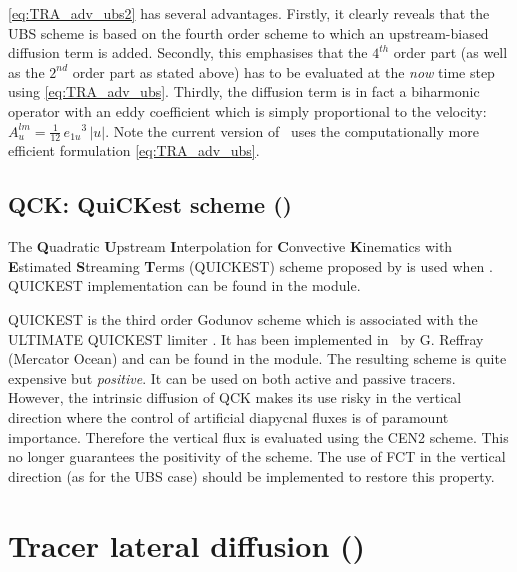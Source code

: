\documentclass[../main/NEMO_manual]{subfiles}
\begin{document}
\autoref{eq:TRA_adv_ubs2} has several advantages.
Firstly, it clearly reveals that the UBS scheme is based on the fourth order scheme to which
an upstream-biased diffusion term is added.
Secondly,
this emphasises that the $4^{th}$ order part (as well as the $2^{nd}$ order part as stated above) has to be evaluated at the \textit{now} time step using \autoref{eq:TRA_adv_ubs}.
Thirdly, the diffusion term is in fact a biharmonic operator with
an eddy coefficient which is simply proportional to the velocity:
$A_u^{lm} = \frac{1}{12} \, {e_{1u}}^3 \, |u|$.
Note the current version of \NEMO\ uses the computationally more efficient formulation
\autoref{eq:TRA_adv_ubs}.

\subsection[QCK: QuiCKest scheme (\forcode{ln_traadv_qck})]{QCK: QuiCKest scheme (\protect{})}
\label{subsec:TRA_adv_qck}

The \textbf{Q}uadratic \textbf{U}pstream \textbf{I}nterpolation for
\textbf{C}onvective \textbf{K}inematics with \textbf{E}stimated \textbf{S}treaming \textbf{T}erms
(QUICKEST) scheme proposed by \citet{leonard_CMAME79} is used when
.
QUICKEST implementation can be found in the  module.

QUICKEST is the third order Godunov scheme which is associated with the ULTIMATE QUICKEST limiter
\citep{leonard_CMAME91}.
It has been implemented in \NEMO\ by G. Reffray (Mercator Ocean) and
can be found in the  module.
The resulting scheme is quite expensive but \textit{positive}.
It can be used on both active and passive tracers.
However, the intrinsic diffusion of QCK makes its use risky in the vertical direction where
the control of artificial diapycnal fluxes is of paramount importance.
Therefore the vertical flux is evaluated using the CEN2 scheme.
This no longer guarantees the positivity of the scheme.
The use of FCT in the vertical direction (as for the UBS case) should be implemented to
restore this property.


\section[Tracer lateral diffusion (\textit{traldf.F90})]{Tracer lateral diffusion (\protect{})}
\label{sec:TRA_ldf}
\end{document}
